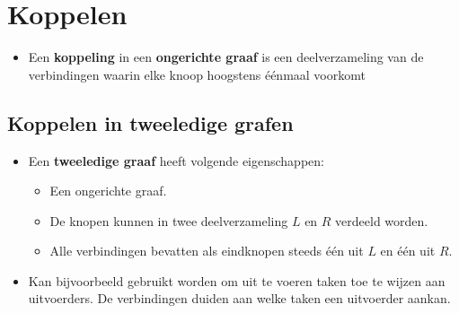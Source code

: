 \chapter{Koppelen}
\begin{itemize}
    \item Een \textbf{koppeling} in een \textbf{ongerichte graaf} is een deelverzameling van de verbindingen waarin elke knoop hoogstens éénmaal voorkomt
\end{itemize}


\section{Koppelen in tweeledige grafen}
\begin{itemize}
    \item Een \textbf{tweeledige graaf} heeft volgende eigenschappen:
    \begin{itemize}
        \item Een ongerichte graaf.
        \item De knopen kunnen in twee deelverzameling $L$ en $R$ verdeeld worden.
        \item Alle verbindingen bevatten als eindknopen steeds één uit $L$ en één uit $R$.
    \end{itemize}
    \item Kan bijvoorbeeld gebruikt worden om uit te voeren taken toe te wijzen aan uitvoerders. De verbindingen duiden aan welke taken een uitvoerder aankan.
\end{itemize}

